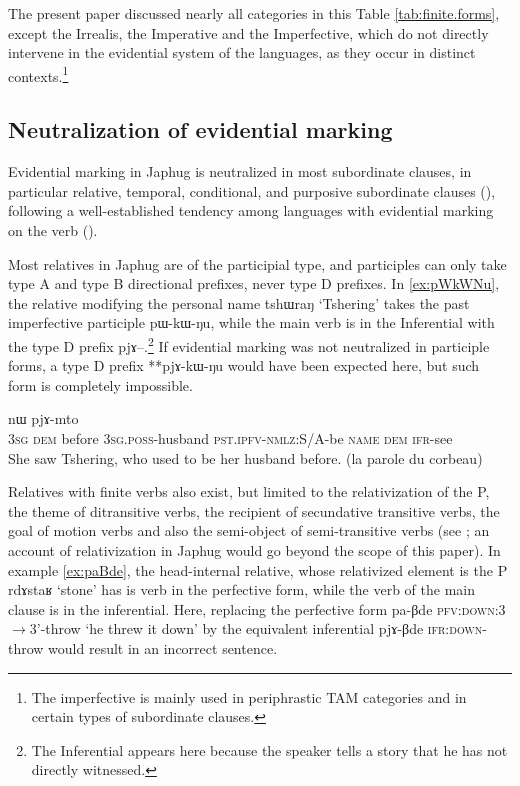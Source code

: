 \documentclass[oldfontcommands,oneside,a4paper,11pt]{article}
\newcommand{\ipa}[1]{{\phon \mbox{#1}}} %
\begin{document}
The present paper discussed nearly all categories in this Table \ref{tab:finite.forms}, except the Irrealis, the Imperative and the Imperfective, which do not directly intervene in the evidential system of the languages, as they occur in distinct contexts.\footnote{The imperfective is mainly used in periphrastic TAM categories and in certain types of subordinate clauses.}

\subsection{Neutralization of evidential marking} \label{sec:neutralization}
Evidential marking in Japhug is neutralized in most subordinate clauses, in particular relative, temporal, conditional, and purposive subordinate clauses (\citealt{jacques14linking}), following a well-established tendency among languages with evidential marking on the verb (\citealt[253-6]{aikhenvald06}).

Most relatives in Japhug are of the participial type, and participles can only take type A and type B directional prefixes, never type D prefixes. In \ref{ex:pWkWNu}, the relative modifying the personal name \ipa{tshɯraŋ} `Tshering' takes the past imperfective participle \ipa{pɯ-kɯ-ŋu}, while the main verb is in the Inferential with the type D prefix \ipa{pjɤ--}.\footnote{The Inferential appears here because the speaker tells a story that he has not directly witnessed.} If evidential marking was not neutralized in participle forms, a type D prefix **\ipa{pjɤ-kɯ-ŋu} would have been expected here, but such form is completely impossible.


\begin{exe}
\ex \label{ex:pWkWNu}
\gll [\ipa{ɯʑo} 	\ipa{nɯ} \ipa{ɕɯŋgɯ} 	\ipa{ɯ-nmaʁ}  \ipa{pɯ-kɯ-ŋu}] 	\ipa{tshɯraŋ} 	\ipa{nɯ} 	\ipa{pjɤ-mto} 	\\
\textsc{3sg} \textsc{dem} before \textsc{3sg.poss}-husband \textsc{pst.ipfv-nmlz}:S/A-be \textsc{name} \textsc{dem} \textsc{ifr}-see \\
\glt She saw Tshering, who used to be her husband before. (la parole du corbeau)
\end{exe}

Relatives with finite verbs also exist, but limited to the relativization of the P, the theme of ditransitive verbs, the recipient of secundative transitive verbs, the goal of motion verbs and also the semi-object of semi-transitive verbs (see \citealt{jacques16relatives}; an account of relativization in Japhug would go beyond the scope of this paper). In example \ref{ex:paBde}, the head-internal relative, whose relativized element is the P \ipa{rdɤstaʁ}  `stone' has is verb in the perfective form, while the verb of the main clause is in the inferential. Here, replacing the perfective form \ipa{pa-βde} \textsc{pfv:down}:3$\rightarrow$3'-throw `he threw it down' by the equivalent inferential \ipa{pjɤ-βde}  \textsc{ifr:down}-throw would result in an incorrect sentence.
\end{document}
